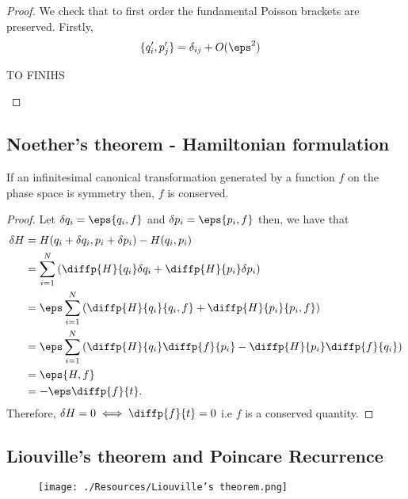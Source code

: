 \documentclass[12pt, a4paper]{article}
\begin{document}
\begin{proof}
    We check that to first order the fundamental Poisson brackets are preserved.
    Firstly, 
    \[\begin{aligned}
        \{q_i',p_j'\} &= \delta_{ij} +O(\eps^2)
    \end{aligned}\]
    \begin{mdthm}
        TO FINIHS
    \end{mdthm}
\end{proof}

\subsection{Noether's theorem - Hamiltonian formulation}

\begin{mdthm}
    If an infinitesimal canonical transformation generated by a function \(f\) on the phase space is symmetry then, \(f\) is conserved.
\end{mdthm}

\begin{proof}
    Let \(\delta q_i =\eps\{q_i,f\}\) and \(\delta p_i = \eps\{p_i,f\}\) then, we have that
    \[\begin{aligned}
        \delta H &= H(q_i +\delta q_i,p_i +\delta p_i) -H(q_i,p_i) \\
        &= \sum_{i=1}^{N} \left( \diffp{H}{{q_i}}\delta q_i +\diffp{H}{{p_i}}\delta p_i \right) \\
        &= \eps \sum_{i=1}^{N} \left( \diffp{H}{{q_i}} \{q_i,f\}+\diffp{H}{{p_i}}\{p_i,f\} \right) \\
        &= \eps \sum_{i=1}^N \left( \diffp{H}{{q_i}}\diffp{f}{{p_i}}-\diffp{H}{{p_i}}\diffp{f}{{q_i}} \right) \\
        &= \eps\{H,f\} \\
        &=-\eps \diffp{f}{t}.
    \end{aligned}\]
    Therefore, \(\delta H =0 \iff \diffp{f}{t}=0\) i.e \(f\) is a conserved quantity.
\end{proof}

\subsection{Liouville's theorem and Poincare Recurrence}

\begin{figure}[H]
     \begin{center}
        \texttt{[image: ./Resources/Liouville's theorem.png]}
    \end{center}
\end{figure}
\end{document}
